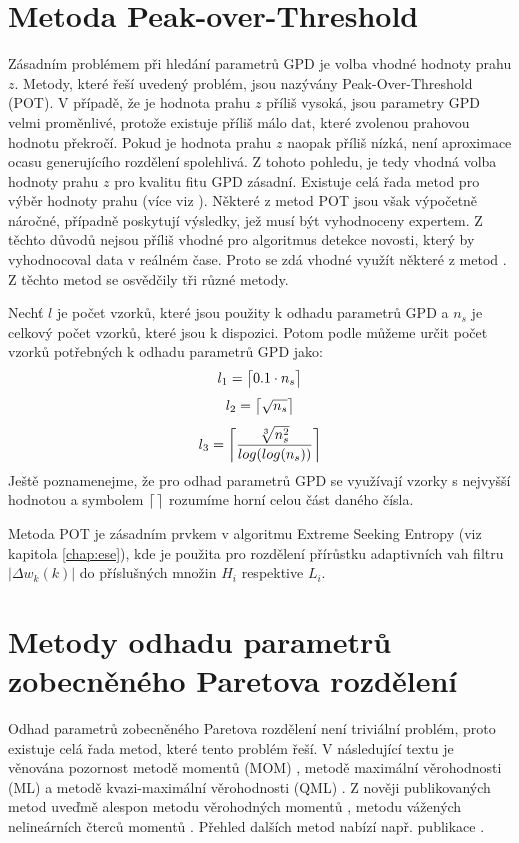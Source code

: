 \section{Metoda Peak-over-Threshold}
Zásadním problémem při hledání parametrů GPD je volba vhodné hodnoty prahu $z$. Metody, které řeší uvedený problém, jsou nazývány Peak-Over-Threshold (POT). V případě, že je hodnota prahu $z$ příliš vysoká, jsou parametry GPD velmi proměnlivé, protože existuje příliš málo dat, které zvolenou prahovou hodnotu překročí. Pokud je hodnota prahu $z$ naopak příliš nízká, není aproximace ocasu generujícího rozdělení spolehlivá.  Z tohoto pohledu, je tedy vhodná volba hodnoty prahu $z$ pro kvalitu fitu GPD zásadní. Existuje celá řada metod pro výběr hodnoty prahu (více viz \cite{scarrott2012review}). Některé z metod POT jsou však výpočetně náročné, případně poskytují výsledky, jež musí být vyhodnoceny expertem. Z těchto důvodů nejsou příliš vhodné pro algoritmus detekce novosti, který by vyhodnocoval data v reálném čase. Proto se zdá vhodné využít některé z metod . Z těchto metod se osvědčily tři různé metody.
\par 
Nechť $l$ je počet vzorků, které jsou použity k odhadu parametrů GPD a $n_s$ je celkový počet vzorků, které jsou k dispozici. Potom podle \cite{DuMouchel,ferreira2003optimising,loretan1994testing} můžeme určit počet vzorků potřebných k odhadu parametrů GPD jako:
\begin{equation} \label{eq:l1}
    l_1=\ceil[\big]{0.1 \cdot n_s}
\end{equation}
\begin{equation} \label{eq:l2}
    l_2=\ceil[\big]{\sqrt{n_s}}
\end{equation}
\begin{equation} \label{eq:l3}
     l_3=\ceil[\bigg]{\frac{\sqrt[3]{n_s^{2}}}{log(log(n_s))}}
\end{equation}
Ještě poznamenejme, že pro odhad parametrů GPD se využívají vzorky s nejvyšší  hodnotou a symbolem $\ceil{\, }$ rozumíme horní celou část daného čísla.
\par
Metoda POT je zásadním prvkem v algoritmu Extreme Seeking Entropy (viz kapitola \ref{chap:ese}), kde je použita pro rozdělení přírůstku adaptivních vah filtru $|\Delta w_k(k)|$ do příslušných množin $H_i$ respektive $L_i$.


\section{Metody odhadu parametrů zobecněného Paretova rozdělení}
Odhad parametrů zobecněného Paretova rozdělení není triviální problém, proto existuje celá řada metod, které tento problém řeší. V následující textu je věnována pozornost metodě momentů (MOM) \cite{mom_orig}, metodě maximální věrohodnosti (ML) \cite{DuMouchel} a metodě kvazi-maximální věrohodnosti (QML) \cite{Luceno}. Z nověji publikovaných metod uveďmě alespon metodu věrohodných momentů \cite{zhang1}, metodu vážených nelineárních čterců momentů \cite{zhao1,park}. Přehled dalších metod nabízí např. publikace \cite{gpd_est}.
